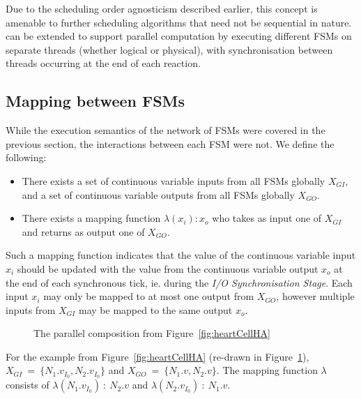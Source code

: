 Due to the scheduling order agnosticism described earlier, this concept is 
amenable to further scheduling algorithms that need not be sequential in 
nature.  \ourTool can be extended to support parallel computation by executing 
different \acp{FSM} on separate threads (whether logical or physical), with 
synchronisation between threads occurring at the end of each reaction.

\subsection{Mapping between \acp{FSM}}
\label{sec:mapping}

While the execution semantics of the network of \acp{FSM} were covered in the 
previous section, the interactions between each \ac{FSM} were not.  We define 
the following:
\begin{itemize}
	\item There exists a set of continuous variable inputs from all \acp{FSM} 
	globally $X_{GI}$, and a set of continuous variable outputs from all 
	\acp{FSM} globally $X_{GO}$.
	\item There exists a mapping function $\lambda(x_i) : x_o$ who takes as 
	input one of $X_{GI}$ and returns as output one of $X_{GO}$.
\end{itemize}

Such a mapping function indicates that the value of the continuous variable 
input $x_i$ should be updated with the value from the continuous variable 
output $x_o$ at the end of each synchronous tick, ie. during the \emph{I/O 
Synchronisation Stage}.  Each input $x_i$ may only be mapped to at most one 
output from $X_{GO}$, however multiple inputs from $X_{GI}$ may be mapped to 
the same output $x_o$.

\begin{figure}
	\centering
	
	\caption{The parallel composition from Figure~\ref{fig:heartCellHA} 
		\label{fig:networkComposition}}
\end{figure}

For the example from Figure~\ref{fig:heartCellHA} (re-drawn in 
Figure~\ref{fig:networkComposition}), 
$X_{GI}~=~\{N_{1}.v_{I_{0}},N_{2}.v_{I_{0}}\}$ and 
$X_{GO}~=~\{N_{1}.v,N_{2}.v\}$. 
The mapping function $\lambda$ consists of 
$\lambda(N_{1}.v_{I_{0}})~:~N_{2}.v$ and $\lambda(N_{2}.v_{I_{0}})~:~N_{1}.v$.
